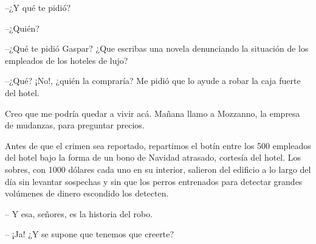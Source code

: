 \documentclass[12pt,twoside,openright,a5paper]{book}
\begin{document}
\vspace{0.5cm}

\hrulefill\hspace{0.2cm} \decofourleft\decofourright \hspace{0.2cm} \hrulefill
\vspace{0.5cm}

\---¿Y qué te pidió?

\---¿Quién?

\---¿Qué te pidió Gaspar? ¿Que escribas una novela denunciando la situación de los empleados de los hoteles de lujo?

\---¿Qué? ¡No!, ¿quién la compraría? Me pidió que lo ayude a robar la caja fuerte del hotel.

\vspace{0.5cm}

\hrulefill\hspace{0.2cm} \decofourleft\decofourright \hspace{0.2cm} \hrulefill
\vspace{0.5cm}

Creo que me podría quedar a vivir acá. Mañana llamo a Mozzanno, la empresa de mudanzas, para preguntar precios.

\vspace{0.5cm}

\hrulefill\hspace{0.2cm} \decofourleft\decofourright \hspace{0.2cm} \hrulefill
\vspace{0.5cm}

Antes de que el crimen sea reportado, repartimos el botín entre los 500
empleados del hotel bajo la forma de un bono de Navidad atrasado, cortesía
del hotel. Los sobres, con 1000 dólares cada uno en su interior, salieron
del edificio a lo largo del día sin levantar sospechas y sin que los perros
entrenados para detectar grandes volúmenes de dinero escondido los detecten.

\vspace{0.5cm}

\hrulefill\hspace{0.2cm} \decofourleft\decofourright \hspace{0.2cm} \hrulefill
\vspace{0.5cm}

\--- Y esa, señores, es la historia del robo.

\--- ¡Ja! ¿Y se supone que tenemos que creerte?

\vspace{0.5cm}
\end{document}
